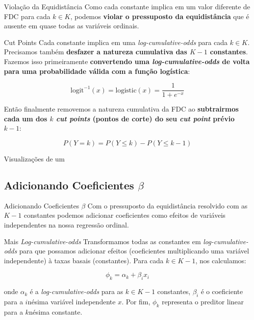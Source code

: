 \begin{frame}{Violação da Equidistância}
	Como cada constante implica em um valor diferente de FDC para cada $k \in K$,
	podemos \textbf{violar o pressuposto da equidistância} que é ausente em quase
	todas as variáveis ordinais.
\end{frame}

\begin{frame}{Cut Points}
	Cada constante implica em uma \textit{log-cumulative-odds} para cada $k \in K$.
	Precisamos também \textbf{desfazer a natureza cumulativa das $K-1$ constantes}.
	Fazemos isso primeiramente \textbf{convertendo uma \textit{log-cumulative-odds}
		de volta para uma probabilidade válida com a função logística}:

	$$\mathrm{logit}^{-1}(x) = \mathrm{logistic}(x) = \frac{1}{1 + e^{-x}}$$

	Então finalmente removemos a natureza cumulativa da FDC ao
	\textbf{subtrairmos cada um dos $k$ \textit{cut points} (pontos de corte)
		do seu \textit{cut point} prévio $k-1$}:

	$$P(Y=k) = P(Y \leq k) - P(Y \leq k-1)$$
\end{frame}

\begin{frame}{Visualizações de um}

\end{frame}

\subsection{Adicionando Coeficientes $\beta$}
\begin{frame}{Adicionando Coeficientes $\beta$}
	Com o pressuposto da equidistância resolvido com as $K-1$ constantes
	podemos adicionar coeficientes como efeitos de variáveis independentes
	na nossa regressão ordinal.
\end{frame}

\begin{frame}{Mais \textit{Log-cumulative-odds}}
	Transformamos todas as constantes em \textit{log-cumulative-odds} para
	que possamos adicionar efeitos (coeficientes multiplicando uma variável
	independente) à taxas basais (constantes).
	\vfill
	Para cada $k \in K-1$, nos calculamos:

	$$\phi_k = \alpha_k + \beta_i x_i$$

	onde $\alpha_k$ é a \textit{log-cumulative-odds} para as $k \in K-1$ constantes,
	$\beta_i$ é o coeficiente para a $i$nésima variável independente $x$.
	\vfill
	Por fim, $\phi_k$ representa o preditor linear para a $k$nésima constante.
\end{frame}

